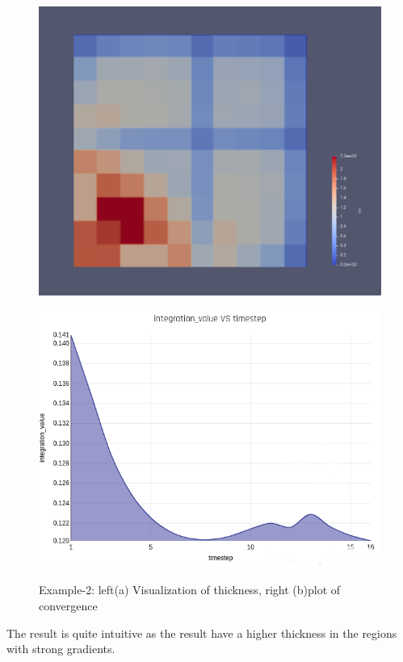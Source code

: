 \documentclass[paper=a4, fontsize=11pt]{scrartcl}
\numberwithin{equation}{section}		%
\numberwithin{figure}{section}			%
\numberwithin{table}{section}				%
\begin{document}
\begin{figure}
\centering
\begin{minipage}{.5\textwidth}
  \centering
  \includegraphics[width=.8\linewidth]{F3.png}
  
  \label{fig:test1}
\end{minipage}%
\begin{minipage}{.5\textwidth}
  \centering
  \includegraphics[width=.8\linewidth]{chartF3.png}
  
  \label{fig:test2}
\end{minipage}
\caption{Example-2: left(a) Visualization of thickness, right (b)plot of convergence }
\end{figure}
The result is quite intuitive as the result have a higher thickness in the regions with strong gradients.
\end{document}
